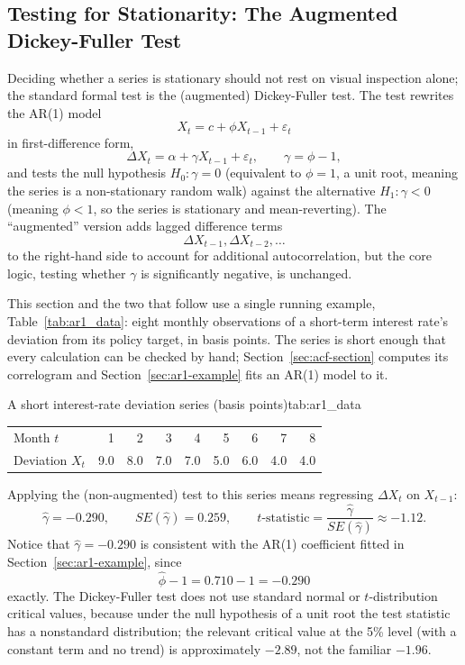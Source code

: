 \documentclass[../ai_in_finance]{subfiles}
\begin{document}
\subsection{Testing for Stationarity: The Augmented Dickey-Fuller Test}
\label{sec:adf-test}

Deciding whether a series is stationary should not rest on visual inspection alone; the standard formal test is the (augmented) Dickey-Fuller test. The test rewrites the AR(1) model
$$X_t = c + \phi X_{t-1} + \varepsilon_t$$
in first-difference form,
\begin{equation}
\label{eq:timeseries-adf}
\Delta X_t = \alpha + \gamma X_{t-1} + \varepsilon_t, \qquad \gamma = \phi - 1,
\end{equation}
and tests the null hypothesis $H_0: \gamma = 0$ (equivalent to $\phi = 1$, a unit root, meaning the series is a non-stationary random walk) against the alternative $H_1: \gamma < 0$ (meaning $\phi < 1$, so the series is stationary and mean-reverting). The ``augmented'' version adds lagged difference terms
$$\Delta X_{t-1}, \Delta X_{t-2}, \ldots$$
to the right-hand side to account for additional autocorrelation, but the core logic, testing whether $\gamma$ is significantly negative, is unchanged.

This section and the two that follow use a single running example, Table~\ref{tab:ar1_data}: eight monthly observations of a short-term interest rate's deviation from its policy target, in basis points. The series is short enough that every calculation can be checked by hand; Section~\ref{sec:acf-section} computes its correlogram and Section~\ref{sec:ar1-example} fits an AR(1) model to it.

\begin{booktable}[htbp]{A short interest-rate deviation series (basis points)}{tab:ar1_data}
\begin{tabular}{lrrrrrrrr}
\toprule
Month $t$ & 1 & 2 & 3 & 4 & 5 & 6 & 7 & 8 \\
Deviation $X_t$ & 9.0 & 8.0 & 7.0 & 7.0 & 5.0 & 6.0 & 4.0 & 4.0 \\
\bottomrule
\end{tabular}
\end{booktable}

Applying the (non-augmented) test to this series means regressing $\Delta X_t$ on $X_{t-1}$:
\begin{equation*}
\hat\gamma = -0.290, \qquad SE(\hat\gamma) = 0.259, \qquad t\text{-statistic} = \frac{\hat\gamma}{SE(\hat\gamma)} \approx -1.12.
\end{equation*}
Notice that $\hat\gamma = -0.290$ is consistent with the AR(1) coefficient fitted in Section~\ref{sec:ar1-example}, since
$$\hat\phi - 1 = 0.710 - 1 = -0.290$$
exactly. The Dickey-Fuller test does not use standard normal or $t$-distribution critical values, because under the null hypothesis of a unit root the test statistic has a nonstandard distribution; the relevant critical value at the 5\% level (with a constant term and no trend) is approximately $-2.89$, not the familiar $-1.96$.
\end{document}

